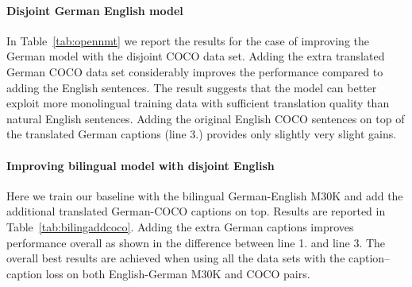 \paragraph{Disjoint German English model}

In Table~\ref{tab:opennmt} we report the results for the case of improving the
German model with the disjoint COCO data set. Adding the extra translated 
German COCO data set considerably improves the performance compared to adding
the English sentences. The result suggests that the model can better exploit 
more monolingual training data with sufficient translation quality than
natural English sentences. Adding the original English COCO sentences
on top of the translated German captions (line 3.) provides only 
slightly very slight gains. 

\paragraph{Improving bilingual model with disjoint English}
Here we train our baseline with the bilingual German-English M30K and add the
additional translated German-COCO captions on top. Results are reported in
Table~\ref{tab:bilingaddcoco}. Adding the extra German captions improves 
performance overall as shown in the difference between line 1. and line 3.
The overall best results are achieved when using all the data sets with the
caption--caption loss on both English-German M30K and COCO pairs. 


